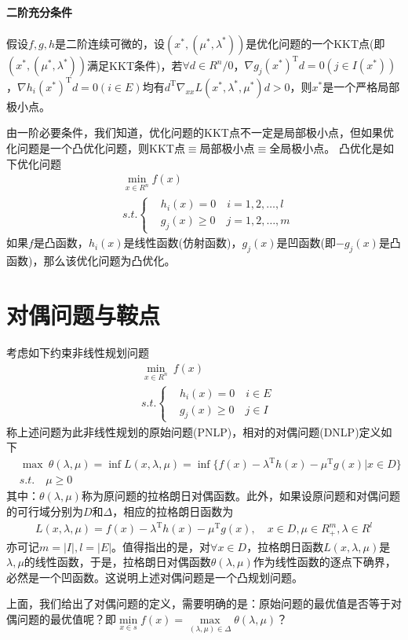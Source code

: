         \paragraph{二阶充分条件}
        假设$f,g,h$是二阶连续可微的，设$(x^*,({\mu}^*,{\lambda}^*))$是优化问题的一个KKT点(即$(x^*,({\mu}^*,{\lambda}^*))$满足KKT条件)，若$\forall d \in R^n/0$，$\nabla g_j(x^*)^\mathrm{T} d=0(j \in I(x^*))$，$\nabla h_i(x^*)^\mathrm{T} d=0(i \in E)$均有$d^\mathrm{T} {\nabla}_{xx}L(x^*,{\lambda}^*,{\mu}^*)d>0$，则$x^*$是一个严格局部极小点。
        \par
        由一阶必要条件，我们知道，优化问题的KKT点不一定是局部极小点，但如果优化问题是一个凸优化问题，则KKT点$\equiv$局部极小点$\equiv$全局极小点。
        凸优化是如下优化问题
        \begin{align*}
        &\mathop {\min}\limits_{x\in R^n} f(x)\\
        &s.t.\left\{
        \begin{aligned}
        &h_i(x)=0\quad i=1,2,\ldots,l\\
        &g_j(x) \geqslant 0\quad j=1,2,\ldots,m
        \end{aligned}
        \right.
        \end{align*}
        如果$f$是凸函数，$h_i(x)$是线性函数(仿射函数)，$g_j(x)$是凹函数(即$-g_j(x)$是凸函数)，那么该优化问题为凸优化。\\
\section{对偶问题与鞍点}
    \par
    考虑如下约束非线性规划问题
    \begin{align*}
    &\mathop {\min}\limits_{x\in R^n}\  f(x)\\
    &s.t.\left\{
    \begin{aligned}
    &h_i(x)=0\quad i \in E\\
    &g_j(x) \geqslant 0\quad j \in I
    \end{aligned}
    \right.
    \end{align*}
    称上述问题为此非线性规划的原始问题(PNLP)，相对的对偶问题(DNLP)定义如下
    \begin{align*}
    & \max\  \theta(\lambda,\mu)=\inf L(x,\lambda,\mu)=\inf\{f(x)-\lambda^\mathrm{T}h(x) -\mu^\mathrm{T}g(x) |x \in D\}\\
    & s.t.\quad \mu \geqslant 0
    \end{align*}
    其中：$\theta(\lambda,\mu)$称为原问题的拉格朗日对偶函数。此外，如果设原问题和对偶问题的可行域分别为$D$和$\Delta$，相应的拉格朗日函数为
    \begin{align*}
    L(x,\lambda,\mu)=f(x)-\lambda^\mathrm{T}h(x) -\mu^\mathrm{T}g(x)  ,\quad x \in D,\mu \in R_+^m,\lambda \in R^l
    \end{align*}
    亦可记$m=|I|,l=|E|$。值得指出的是，对$\forall x \in D$，拉格朗日函数$L(x,\lambda,\mu)$是$\lambda,\mu$的线性函数，于是，拉格朗日对偶函数$\theta(\lambda,\mu)$作为线性函数的逐点下确界，必然是一个凹函数。这说明上述对偶问题是一个凸规划问题。
    \par
    上面，我们给出了对偶问题的定义，需要明确的是：原始问题的最优值是否等于对偶问题的最优值呢？即$\mathop {\min}\limits_{x \in s}f(x)=\mathop {\max}\limits_{(\lambda,\mu) \in \Delta }\theta(\lambda,\mu)$？
